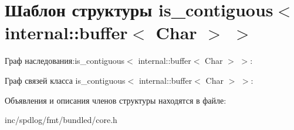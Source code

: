 \hypertarget{structis__contiguous_3_01internal_1_1buffer_3_01Char_01_4_01_4}{}\section{Шаблон структуры is\+\_\+contiguous$<$ internal\+:\+:buffer$<$ Char $>$ $>$}
\label{structis__contiguous_3_01internal_1_1buffer_3_01Char_01_4_01_4}


Граф наследования\+:is\+\_\+contiguous$<$ internal\+:\+:buffer$<$ Char $>$ $>$\+:


Граф связей класса is\+\_\+contiguous$<$ internal\+:\+:buffer$<$ Char $>$ $>$\+:


Объявления и описания членов структуры находятся в файле\+:\begin{DoxyCompactItemize}
\item 
inc/spdlog/fmt/bundled/core.\+h\end{DoxyCompactItemize}
